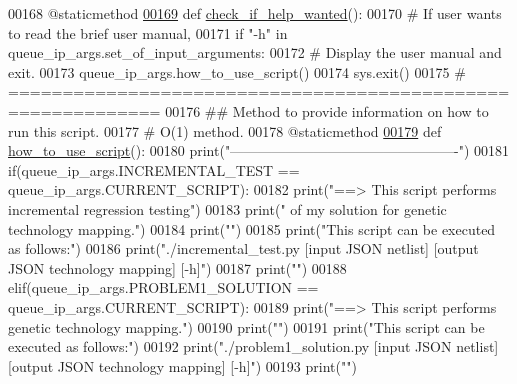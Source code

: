 \begin{DoxyCode}
00168     @staticmethod
\hypertarget{queue__ip__arguments_8py_source_l00169}{}\hyperlink{classutilities_1_1queue__ip__arguments_1_1queue__ip__args_a1a87ae4035acfa51fe1d1aff53f770f3}{00169}     \textcolor{keyword}{def }\hyperlink{classutilities_1_1queue__ip__arguments_1_1queue__ip__args_a1a87ae4035acfa51fe1d1aff53f770f3}{check\_if\_help\_wanted}():
00170         \textcolor{comment}{# If user wants to read the brief user manual,}
00171         \textcolor{keywordflow}{if} \textcolor{stringliteral}{"-h"} \textcolor{keywordflow}{in} queue\_ip\_args.set\_of\_input\_arguments:
00172             \textcolor{comment}{# Display the user manual and exit.}
00173             queue\_ip\_args.how\_to\_use\_script()
00174             sys.exit()
00175     \textcolor{comment}{# ============================================================}
00176     \textcolor{comment}{##  Method to provide information on how to run this script.}
00177     \textcolor{comment}{#   O(1) method.}
00178     @staticmethod
\hypertarget{queue__ip__arguments_8py_source_l00179}{}\hyperlink{classutilities_1_1queue__ip__arguments_1_1queue__ip__args_a5fecd33a91d20f19acba2fb1b8d1a60e}{00179}     \textcolor{keyword}{def }\hyperlink{classutilities_1_1queue__ip__arguments_1_1queue__ip__args_a5fecd33a91d20f19acba2fb1b8d1a60e}{how\_to\_use\_script}():
00180         print(\textcolor{stringliteral}{"-------------------------------------------------"})
00181         if(queue\_ip\_args.INCREMENTAL\_TEST == queue\_ip\_args.CURRENT\_SCRIPT):
00182             print(\textcolor{stringliteral}{"==>  This script performs incremental regression testing"})
00183             print(\textcolor{stringliteral}{" of my solution for genetic technology mapping."})
00184             print(\textcolor{stringliteral}{""})
00185             print(\textcolor{stringliteral}{"This script can be executed as follows:"})
00186             print(\textcolor{stringliteral}{"./incremental\_test.py [input JSON netlist] [output JSON technology mapping] [-h]"})
00187             print(\textcolor{stringliteral}{""})
00188         elif(queue\_ip\_args.PROBLEM1\_SOLUTION == queue\_ip\_args.CURRENT\_SCRIPT):
00189             print(\textcolor{stringliteral}{"==>  This script performs genetic technology mapping."})
00190             print(\textcolor{stringliteral}{""})
00191             print(\textcolor{stringliteral}{"This script can be executed as follows:"})
00192             print(\textcolor{stringliteral}{"./problem1\_solution.py [input JSON netlist] [output JSON technology mapping] [-h]"})
00193             print(\textcolor{stringliteral}{""})

\end{DoxyCode}
